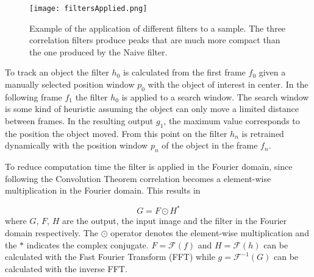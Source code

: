 \begin{figure}
  \centering
  \texttt{[image: filtersApplied.png]}
  \caption{Example of the application of different filters to a sample.  The three correlation
filters produce peaks that are much more compact than the
one produced by the Naive filter. \cite{BolmVisu2010}}
  \label{fig:filtersApplied}
\end{figure}

To track an object the filter $h_0$ is calculated from the first frame $f_0$ given a manually selected position window $p_0$ with the object of interest in center.
In the following frame $f_1$ the filter $h_0$ is applied to a search window. 
The search window is some kind of heuristic assuming the object can only move a limited distance between frames. 
In the resulting output $g_1$, the maximum value corresponds to the position the object moved. 
From this point on the filter $h_n$ is retrained dynamically with the position window $p_n$ of the object in the frame $f_n$.

To reduce computation time the filter is applied in the Fourier domain, since following the Convolution Theorem correlation becomes a element-wise multiplication in the Fourier domain. This results in

\begin{equation}
G = F \odot H^{*}
\end{equation}
where $G$, $F$, $H$ are the output, the input image and the filter in the Fourier domain respectively.
The $\odot$ operator denotes the element-wise multiplication and the $*$ indicates the complex conjugate.
$F = \mathcal{F}(f)$ and $H = \mathcal{F}(h)$ can be calculated with the Fast Fourier Transform (FFT)\cite{Nume2007}
while $g = \mathcal{F}^{-1}(G)$ can be calculated with the inverse FFT. 

